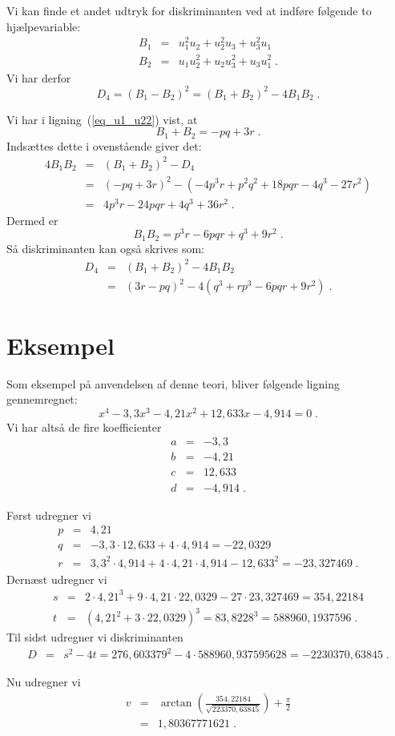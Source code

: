 \documentclass[12pt,oneside,a4paper]{article}
\newcommand{\bas}{\begin{eqnarray*}}
\newcommand{\eas}{\end{eqnarray*}}
\begin{document}
Vi kan finde et andet udtryk for diskriminanten ved
at indføre følgende to hjælpevariable:
\bas
B_1 &=& u_1^2u_2 + u_2^2u_3 + u_3^2u_1 \\
B_2 &=& u_1u_2^2 + u_2u_3^2 + u_3u_1^2 \;.
\eas
Vi har derfor
\begin{equation}
D_4 = (B_1-B_2)^2 = (B_1+B_2)^2 - 4B_1B_2\;.
\end{equation}

Vi har i ligning~(\ref{eq_u1_u22}) vist, at
\[
B_1 + B_2 = -pq + 3r\;.
\]
Indsættes dette i ovenstående giver det:
\bas
4B_1B_2 &=& (B_1+B_2)^2 - D_4 \\
&=& (-pq+3r)^2 - (-4p^3r + p^2q^2 + 18pqr - 4q^3 - 27r^2) \\
&=& 4p^3r - 24pqr + 4q^3 + 36r^2 \;.
\eas
Dermed er
\begin{equation}
B_1B_2 = p^3r - 6pqr + q^3 + 9r^2\;.
\end{equation}
Så diskriminanten kan også skrives som:
\bas
D_4 &=& (B_1+B_2)^2 - 4B_1B_2 \\
&=& (3r-pq)^2 - 4(q^3 + rp^3 - 6pqr + 9r^2)  \;.
\eas


\section{Eksempel}
Som eksempel på anvendelsen af denne teori, bliver følgende
ligning gennemregnet:
\begin{equation}
    x^4 - 3,3 x^3 - 4,21 x^2 + 12,633 x - 4,914 = 0 \;.
\end{equation}
Vi har altså de fire koefficienter
\bas
a &=& -3,3 \\
b &=& -4,21 \\
c &=& 12,633 \\
d &=& -4,914 \;.
\eas

Først udregner vi
\bas
p &=& 4,21 \\
q &=& -3,3\cdot 12,633 + 4\cdot 4,914 = -22,0329 \\
r &=& 3,3^2\cdot 4,914 + 4\cdot 4,21 \cdot 4,914 - 12,633^2 = -23,327469 \;.
\eas
Dernæst udregner vi
\bas
s &=& 2\cdot 4,21^3 + 9\cdot 4,21 \cdot 22,0329 - 27\cdot 23,327469
    = 354,22184\\
t &=&  (4,21^2 + 3\cdot 22,0329)^3 = 83,8228^3
    = 588960,1937596 \;.
\eas
Til sidst udregner vi diskriminanten 
\bas
D &=& s^2-4t = 276,603379^2 - 4\cdot 588960,937595628 = -2230370,63845 \;.
\eas

Nu udregner vi
\bas
v &=& \arctan\left(\frac{354,22184}{\sqrt{223370,63845}}\right) + \frac{\pi}{2} \\
&=& 1,80367771621 \;.
\eas
\end{document}

